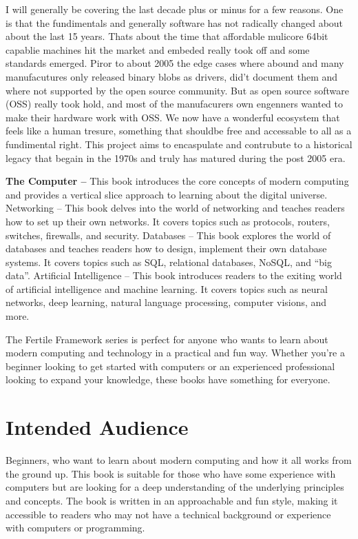 I will generally be covering the last decade plus or minus for a few reasons. One is that the fundimentals and generally software has not radically changed about about the last 15 years. Thats about the time that affordable mulicore 64bit capablie machines hit the market and embeded really took off and some standards emerged. Piror to about 2005 the edge cases where abound and many manufacutures only released binary blobs as drivers, did’t document them and where not supported by the open source community. But as open source software (OSS) really took hold, and most of the manufacurers own engenners wanted to make their hardware work with OSS. We now have a wonderful ecosystem that feels like a human tresure, something that shouldbe free and accessable to all as a fundimental right. This project aims to encaspulate and contrubute to a historical legacy that begain in the 1970s and truly has matured during the post 2005 era.  

\textbf{The Computer –} This book introduces the core concepts of modern computing and provides a vertical slice approach to learning about the digital universe.
Networking – This book delves into the world of networking and teaches readers how to set up their own networks.  It covers topics such as protocols, routers, switches, firewalls, and security.
Databases – This book explores the world of databases and teaches readers how to design, implement their own database systems. It covers topics such as SQL, relational databases, NoSQL, and “big data”.
Artificial Intelligence – This book introduces readers to the exiting world of artificial intelligence and machine learning. It covers topics such as neural networks, deep learning, natural language processing, computer visions, and more.

The Fertile Framework series is perfect for anyone who wants to learn about modern computing and technology in a practical and fun way. Whether you're a beginner looking to get started with computers or an experienced professional looking to expand your knowledge, these books have something for everyone.

\section{Intended Audience}

Beginners, who want to learn about modern computing and how it all works from the ground up. This book is suitable for those who have some experience with computers but are looking for a deep understanding of the underlying principles and concepts. The book is written in an approachable and fun style, making it accessible to readers who may not have a technical background or experience with computers or programming.

